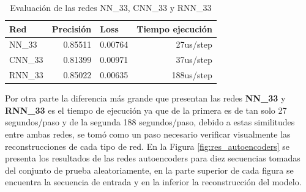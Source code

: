 \begin{table}[H]
\centering
\begin{center}
\begin{tabular}{|l|r|r|r|}
\hline
\textbf{Red} & \multicolumn{1}{l|}{\textbf{Precisi\'{o}n}} & \multicolumn{1}{l|}{\textbf{Loss}} & \multicolumn{1}{l|}{\textbf{Tiempo ejecuci\'{o}n}} \\ \hline
NN\_33              & 0.85511                                 & 0.00764                            & 27us/step                                      \\ \hline
CNN\_33             & 0.81399                                 & 0.00971                            & 37us/step                                      \\ \hline
RNN\_33             & 0.85022                                 & 0.00635                            & 188us/step                                     \\ \hline
\end{tabular}
\end{center}
\caption{Evaluaci\'{o}n de las redes NN\_33, CNN\_33 y RNN\_33}
\label{table:evaluacion_redes}
\end{table}

Por otra parte la diferencia m\'{a}s grande que presentan las redes \textbf{NN\_33} y \textbf{RNN\_33} es el tiempo de ejecuci\'{o}n ya que de la primera es de tan solo 27 segundos/paso y de la segunda 188 segundos/paso, debido a estas similitudes entre ambas redes, se tom\'{o} como un paso necesario verificar visualmente las reconstrucciones de cada tipo de red. En la Figura \ref{fig:res_autoencoders} se presenta los resultados de las redes autoencoders para diez secuencias tomadas del conjunto de prueba aleatoriamente, en la parte superior de cada figura se encuentra la secuencia de entrada y en la inferior la reconstrucci\'{o}n del modelo.

